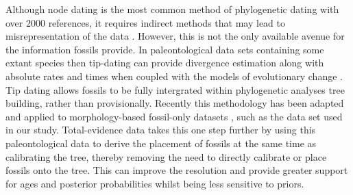 \documentclass[11pt,letterpaper]{article}
\begin{document}
Although node dating is the most common method of phylogenetic dating with over 2000 references, it requires indirect methods that may lead to misrepresentation of the data \citep{turner2017empirical}. %
 However, this is not the only available avenue for the information fossils provide. %
In paleontological data sets containing some extant species then tip-dating can provide divergence estimation along with absolute rates and times when coupled with the models of evolutionary change \citep{pyron2011divergence}. %
Tip dating allows fossils to be fully intergrated within phylogenetic analyses tree building, rather than provisionally. Recently this methodology has been adapted and applied to morphology-based fossil-only datasets \citep{slater2015iterative}, such as the data set used in our study. %
Total-evidence data takes this one step further by using this paleontological data to derive the placement of fossils at the same time as calibrating the tree, thereby removing the need to directly calibrate or place fossils onto the tree. This can improve the resolution and provide greater support for ages and posterior probabilities whilst being less sensitive to priors.  
\end{document}
